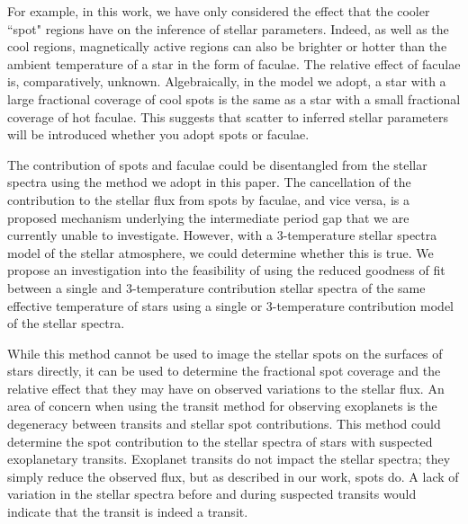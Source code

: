 For example, in this work, we have only considered the effect that the cooler ``spot" regions have on the inference of stellar parameters.
Indeed, as well as the cool regions, magnetically active regions can also be brighter or hotter than the ambient temperature of a star in the form of faculae.
The relative effect of faculae is, comparatively, unknown.
Algebraically, in the model we adopt, a star with a large fractional coverage of cool spots is the same as a star with a small fractional coverage of hot faculae.
This suggests that scatter to inferred stellar parameters will be introduced whether you adopt spots or faculae.

The contribution of spots and faculae could be disentangled from the stellar spectra using the method we adopt in this paper.
The cancellation of the contribution to the stellar flux from spots by faculae, and vice versa, is a proposed mechanism underlying the intermediate period gap that we are currently unable to investigate.
However, with a 3-temperature stellar spectra model of the stellar atmosphere, we could determine whether this is true.
We propose an investigation into the feasibility of using the reduced goodness of fit between a single and 3-temperature contribution stellar spectra of the same effective temperature of stars using a single or 3-temperature contribution model of the stellar spectra.

While this method cannot be used to image the stellar spots on the surfaces of stars directly, it can be used to determine the fractional spot coverage and the relative effect that they may have on observed variations to the stellar flux.
An area of concern when using the transit method for observing exoplanets is the degeneracy between transits and stellar spot contributions.
This method could determine the spot contribution to the stellar spectra of stars with suspected exoplanetary transits.
Exoplanet transits do not impact the stellar spectra; they simply reduce the observed flux, but as described in our work, spots do.
A lack of variation in the stellar spectra before and during suspected transits would indicate that the transit is indeed a transit.

